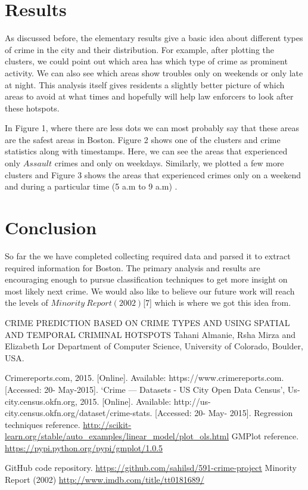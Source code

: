 \documentclass[journal, a4paper]{IEEEtran}
\begin{document}
\section{Results}
    As discussed before, the elementary results give a basic idea about different types of crime in the city and their distribution. For example, after plotting the clusters, we could point out which area has which type of crime as prominent activity. We can also see which areas show troubles only on weekends or only late at night. This analysis itself gives residents a slightly better picture of which areas to avoid at what times and hopefully will help law enforcers to look after these hotspots.

   In Figure 1, where there are less dots we can most probably say that these areas are the safest areas in Boston. Figure 2 shows one of the clusters and crime statistics along with timestamps. Here, we can see the areas that experienced only $Assault$ crimes and only on weekdays. Similarly, we plotted a few more clusters and Figure 3 shows the areas that experienced crimes only on a weekend and during a particular time (5 a.m to 9 a.m) .

\section{Conclusion}
    So far the we have completed collecting required data and parsed it to extract required information for Boston. The primary analysis and results are encouraging enough to pursue classification techniques to get more insight on most likely next crime. We would also like to believe our future work will reach the levels of $Minority\ Report(2002)$[7] which is where we got this idea from.

\begin{thebibliography}{5}

    CRIME PREDICTION BASED ON CRIME TYPES AND USING SPATIAL AND  TEMPORAL CRIMINAL HOTSPOTS Tahani Almanie, Rsha Mirza and Elizabeth Lor Department of Computer Science, University of Colorado, Boulder, USA.

    Crimereports.com, 2015. [Online]. Available: https://www.crimereports.com. [Accessed: 20- May-2015].
    `Crime — Datasets - US City Open Data Census', Us-city.census.okfn.org, 2015. [Online]. Available: http://us-city.census.okfn.org/dataset/crime-stats. [Accessed: 20- May- 2015].
    Regression techniques reference. 
    \url{http://scikit-learn.org/stable/auto_examples/linear_model/plot_ols.html}
    GMPlot reference.
    \url{https://pypi.python.org/pypi/gmplot/1.0.5}
    
    GitHub code repository.
    \url{https://github.com/sahilsd/591-crime-project}
    Minority Report (2002)
    \url{http://www.imdb.com/title/tt0181689/}

\end{thebibliography}

\end{document}
